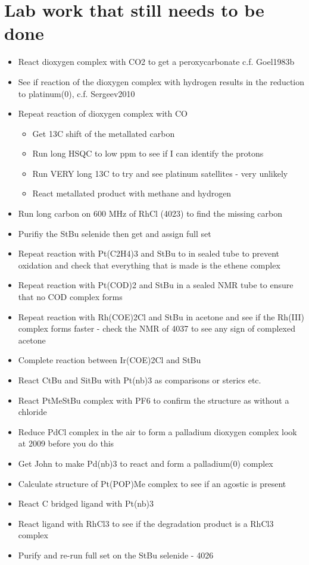 \section{Lab work that still needs to be done}
\begin{itemize}
\item{React dioxygen complex with CO2 to get a peroxycarbonate c.f. Goel1983b}
\item{See if reaction of the dioxygen complex with hydrogen results in the reduction to platinum(0), c.f. Sergeev2010}
\item{Repeat reaction of dioxygen complex with CO}
	\begin{itemize}
	\item{Get 13C shift of the metallated carbon}
	\item{Run long HSQC to low ppm to see if I can identify the protons}
	\item{Run VERY long 13C to try and see platinum satellites - very unlikely}
	\item{React metallated product with methane and hydrogen}
	\end{itemize}
\item{Run long carbon on 600 MHz of RhCl (4023) to find the missing carbon}
\item{Purifiy the StBu selenide then get and assign full set}
\item{Repeat reaction with Pt(C2H4)3 and StBu to in sealed tube to prevent oxidation and check that everything that is made is the ethene complex}
\item{Repeat reaction with Pt(COD)2 and StBu in a sealed NMR tube to ensure that no COD complex forms}
\item{Repeat reaction with Rh(COE)2Cl and StBu in acetone and see if the Rh(III) complex forms faster - check the NMR of 4037 to see any sign of complexed acetone}
\item{Complete reaction between Ir(COE)2Cl and StBu}
\item{React CtBu and SitBu with Pt(nb)3 as comparisons or sterics etc.}
\item{React PtMeStBu complex with PF6 to confirm the structure as without a chloride}
\item{Reduce PdCl complex in the air to form a palladium dioxygen complex look at 2009 before you do this}
\item{Get John to make Pd(nb)3 to react and form a palladium(0) complex}
\item{Calculate structure of Pt(POP)Me complex to see if an agostic is present}
\item{React C bridged ligand with Pt(nb)3}
\item{React ligand with RhCl3 to see if the degradation product is a RhCl3 complex}
\item{Purify and re-run full set on the StBu selenide - 4026}
\end{itemize}

